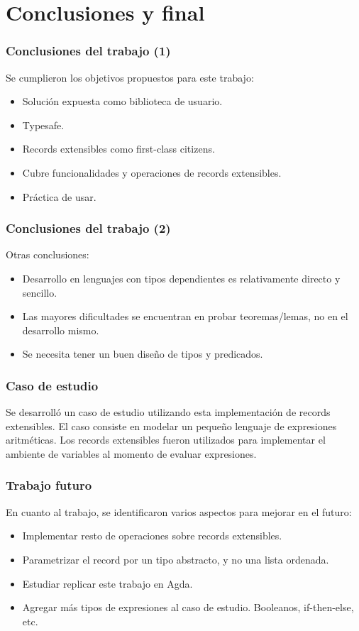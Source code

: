 \documentclass{beamer}
\begin{document}
\section{Conclusiones y final}

\begin{frame}
\frametitle{Conclusiones del trabajo (1)}

Se cumplieron los objetivos propuestos para este trabajo:

\begin{itemize}
\item Solución expuesta como biblioteca de usuario.
\item Typesafe.
\item Records extensibles como first-class citizens.
\item Cubre funcionalidades y operaciones de records extensibles.
\item Práctica de usar.
\end{itemize}

\end{frame}

\begin{frame}
\frametitle{Conclusiones del trabajo (2)}

Otras conclusiones:

\begin{itemize}
\item Desarrollo en lenguajes con tipos dependientes es relativamente directo y sencillo.
\item Las mayores dificultades se encuentran en probar teoremas/lemas, no en el desarrollo mismo.
\item Se necesita tener un buen diseño de tipos y predicados.
\end{itemize}

\end{frame}

\begin{frame}
\frametitle{Caso de estudio}

Se desarrolló un caso de estudio utilizando esta implementación de records extensibles. El caso consiste en modelar un pequeño lenguaje de expresiones aritméticas. Los records extensibles fueron utilizados para implementar el ambiente de variables al momento de evaluar expresiones.

\end{frame}

\begin{frame}
\frametitle{Trabajo futuro}

En cuanto al trabajo, se identificaron varios aspectos para mejorar en el futuro:

\begin{itemize}
\item Implementar resto de operaciones sobre records extensibles.
\item Parametrizar el record por un tipo abstracto, y no una lista ordenada.
\item Estudiar replicar este trabajo en Agda.
\item Agregar más tipos de expresiones al caso de estudio. Booleanos, if-then-else, etc.
\end{itemize}
\end{frame}
\end{document}
